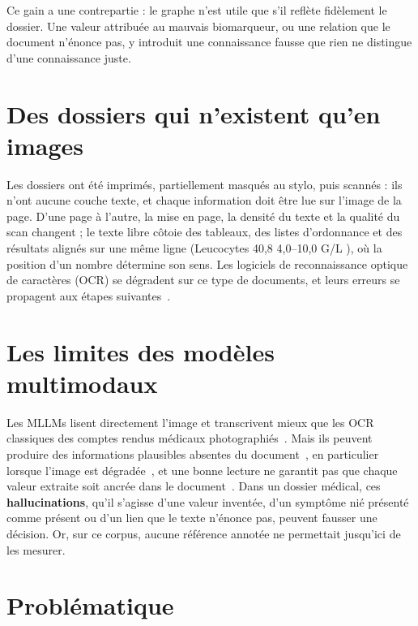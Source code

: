 Ce gain a une contrepartie : le graphe n'est utile que s'il reflète fidèlement le dossier. Une valeur attribuée au mauvais biomarqueur, ou une relation que le document n'énonce pas, y introduit une connaissance fausse que rien ne distingue d'une connaissance juste.

\section{Des dossiers qui n'existent qu'en images}

Les dossiers ont été imprimés, partiellement masqués au stylo, puis scannés : ils n'ont aucune couche texte, et chaque information doit être lue sur l'image de la page. D'une page à l'autre, la mise en page, la densité du texte et la qualité du scan changent ; le texte libre côtoie des tableaux, des listes d'ordonnance et des résultats alignés sur une même ligne (\og Leucocytes 40,8 4,0--10,0 G/L \fg{}), où la position d'un nombre détermine son sens. Les logiciels de reconnaissance optique de caractères (OCR) se dégradent sur ce type de documents, et leurs erreurs se propagent aux étapes suivantes~\cite{zhang2025ocrhindersrag}.

\section{Les limites des modèles multimodaux}

Les MLLMs lisent directement l'image et transcrivent mieux que les OCR classiques des comptes rendus médicaux photographiés~\cite{neveditsin2026compact}. Mais ils peuvent produire des informations plausibles absentes du document~\cite{bai2025survey}, en particulier lorsque l'image est dégradée~\cite{he2025seeing}, et une bonne lecture ne garantit pas que chaque valeur extraite soit ancrée dans le document~\cite{raptorplus2026}. Dans un dossier médical, ces \textbf{hallucinations}, qu'il s'agisse d'une valeur inventée, d'un symptôme nié présenté comme présent ou d'un lien que le texte n'énonce pas, peuvent fausser une décision. Or, sur ce corpus, aucune référence annotée ne permettait jusqu'ici de les mesurer.

\section{Problématique}

